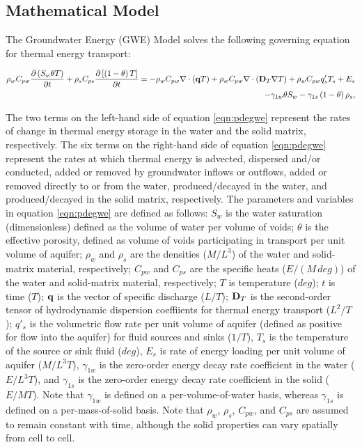 \subsection{Mathematical Model} \label{sec:mathmodel}

The Groundwater Energy (GWE) Model solves the following governing equation for thermal energy transport:

\begin{equation}
\label{eqn:pdegwe}
\begin{aligned}
\rho_w C_{pw} \frac {\partial \left ( S_w \theta T \right )}{\partial t}
+ \rho_s C_{ps} \frac {\partial \left [ \left (1 - \theta \right ) T \right ]}{\partial t}
= - \rho_w C_{pw} \nabla \cdot \left ( \mathbf{q} T  \right ) 
+ \rho_w C_{pw} \nabla \cdot \left ( \mathbf{D}_T \nabla T \right )
+ \rho_w C_{pw} q'_s T_s + E_s  \\
- \gamma_{1w} \theta S_w - \gamma_{1s} \left (1 - \theta \right ) \rho_s,
\end{aligned}
\end{equation}

\noindent The two terms on the left-hand side of equation \ref{eqn:pdegwe} represent the rates of change in thermal energy storage in the water and the solid matrix, respectively. The six terms on the right-hand side of equation \ref{eqn:pdegwe} represent the rates at which thermal energy is advected, dispersed and/or conducted, added or removed by groundwater inflows or outflows, added or removed directly to or from the water, produced/decayed in the water, and produced/decayed in the solid matrix, respectively. The parameters and variables in equation \ref{eqn:pdegwe} are defined as follows: $S_w$ is the water saturation (dimensionless) defined as the volume of water per volume of voids; $\theta$ is the effective porosity, defined as volume of voids participating in transport per unit volume of aquifer; $\rho_w$ and $\rho_s$ are the densities ($M/L^3$) of the water and solid-matrix material, respectively; $C_{pw}$ and $C_{ps}$ are the specific heats ($E/(M \, deg)$) of the water and solid-matrix material, respectively; $T$ is temperature ($deg$); $t$ is time ($T$); $\mathbf{q}$ is the vector of specific discharge ($L/T$); $\mathbf{D}_T$ is the second-order tensor of hydrodynamic dispersion coeffiients for thermal energy transport ($L^2/T$); $q'_s$ is the volumetric flow rate per unit volume of aquifer (defined as positive for flow into the aquifer) for fluid sources and sinks ($1/T$), $T_s$ is the temperature of the source or sink fluid ($deg$), $E_s$ is rate of energy loading per unit volume of aquifer ($M/L^3T$), $\gamma_{1w}$ is the zero-order energy decay rate coefficient in the water ($E/L^3T$), and $\gamma_{1s}$ is the zero-order energy decay rate coefficient in the solid ($E/MT$). Note that $\gamma_{1w}$ is defined on a per-volume-of-water basis, whereas $\gamma_{1s}$ is defined on a per-mass-of-solid basis. Note that $\rho_w$, $\rho_s$, $C_{pw}$, and $C_{ps}$ are assumed to remain constant with time, although the solid properties can vary spatially from cell to cell.

